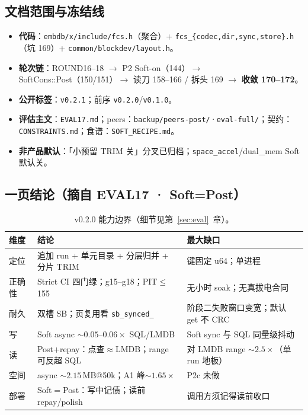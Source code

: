 \subsection{文档范围与冻结线}
\begin{itemize}[leftmargin=1.6em]
  \item \textbf{代码}：\texttt{embdb/x/include/fcs.h}（聚合）+ \texttt{fcs\_\{codec,dir,sync,store\}.h}（坑 169）+ \texttt{common/blockdev/layout.h}。
  \item \textbf{轮次链}：ROUND16--18 $\to$ P2 Soft-on（144）$\to$ SoftCons::Post（150/151）$\to$ 读刀 158--166 / 拆头 169 $\to$ \textbf{收敛 170--172}。
  \item \textbf{公开标签}：\texttt{v0.2.1}；前序 \texttt{v0.2.0}/\texttt{v0.1.0}。
  \item \textbf{评估主文}：\texttt{EVAL17.md}；peers：\texttt{backup/peers-post/}·\texttt{eval-full/}；契约：\texttt{CONSTRAINTS.md}；食谱：\texttt{SOFT\_RECIPE.md}。
  \item \textbf{非产品默认}：「小预留 TRIM 关」分叉已归档；\texttt{space\_accel}/dual\_mem Soft 默认关。
\end{itemize}

\subsection{一页结论（摘自 EVAL17 · Soft=Post）}
\begin{table}[ht]
\centering
\small
\begin{tabular}{@{}p{2.2cm}p{7.2cm}p{4.8cm}@{}}
\toprule
维度 & 结论 & 最大缺口 \\
\midrule
定位 & 追加 run + 单元目录 + 分层归并 + 分片 TRIM & 键固定 u64；单进程 \\
正确性 & Strict CI 四门绿；g15--g18；PIT$\le$155 & 无小时 soak；无真拔电合同 \\
耐久 & 双槽 SB；页复用看 \texttt{sb\_synced\_} & 阶段二失败窗口变宽；默认 get 不 CRC \\
写 & Soft async $\sim 0.05$--$0.06\times$ SQL/LMDB & Soft sync 与 SQL 同量级抖动 \\
读 & Post+repay：点查$\approx$LMDB；range 可反超 SQL & 对 LMDB range $\sim 2.5\times$（单 run 地板） \\
空间 & async $\sim 2.15\,\mathrm{MB}$@50k；A1 峰$\sim 1.65\times$ & P2c 未做 \\
部署 & Soft$=$Post：写中记债；读前 repay/polish & 调用方须记得读前收口 \\
\bottomrule
\end{tabular}
\caption{v0.2.0 能力边界（细节见第~\ref{sec:eval}~章）。}
\end{table}

